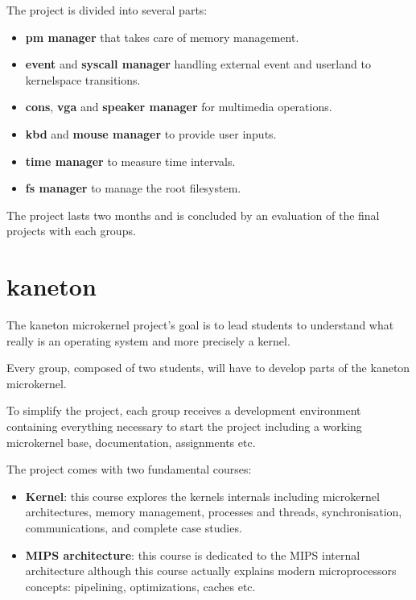 \begin{multicols}{2}
The project is divided into several parts:

\begin{itemize}
  \item
    \textbf{pm manager} that takes care of memory management.
  \item
    \textbf{event} and \textbf{syscall manager} handling external
    event and userland to kernelspace transitions.
  \item
    \textbf{cons}, \textbf{vga} and \textbf{speaker manager} for
    multimedia operations.
  \item
    \textbf{kbd} and \textbf{mouse manager} to provide user inputs.
  \item
    \textbf{time manager} to measure time intervals.
  \item
    \textbf{fs manager} to manage the root filesystem.
\end{itemize}

The project lasts two months and is concluded by an evaluation of the
final projects with each groups.

%
%

\section{kaneton}

The kaneton microkernel project's goal is to lead students to understand
what really is an operating system and more precisely a kernel.

Every group, composed of two students, will have to develop parts of
the kaneton microkernel.

To simplify the project, each group receives a development environment
containing everything necessary to start the project including a
working microkernel base, documentation, assignments etc.

The project comes with two fundamental courses:

\begin{itemize}
  \item
    \textbf{Kernel}: this course explores the kernels internals including
    microkernel architectures, memory management, processes and threads,
    synchronisation, communications, and complete case studies.
  \item
    \textbf{MIPS architecture}: this course is dedicated to the MIPS internal
    architecture although this course actually explains modern microprocessors
    concepts: pipelining, optimizations, caches etc.
\end{itemize}


\end{multicols}
